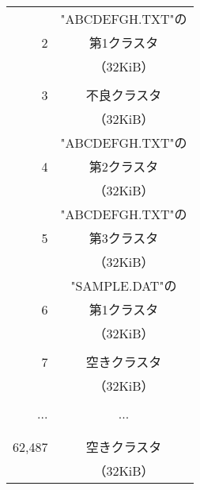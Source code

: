 \documentclass[border=1mm]{standalone}
\begin{document}
\tt\small\begin{tabular}{r | c |}\cline{2-2}
  & "ABCDEFGH.TXT"の \\
2 & 第1クラスタ  \\
  & （32KiB）    \\\cline{2-2}
  &              \\
3 & 不良クラスタ \\
  & （32KiB）   \\\cline{2-2}
  & "ABCDEFGH.TXT"の \\
4 & 第2クラスタ \\
  & （32KiB）   \\\cline{2-2}
  & "ABCDEFGH.TXT"の \\
5 & 第3クラスタ \\
  & （32KiB）   \\\cline{2-2}
  & "SAMPLE.DAT"の \\
6 & 第1クラスタ \\
  & （32KiB）   \\\cline{2-2}
  &             \\
7 & 空きクラスタ \\
  & （32KiB）   \\\cline{2-2}
  &             \\
... & ...       \\
  &             \\\cline{2-2}
  &             \\
62,487 & 空きクラスタ \\
  & （32KiB）   \\\cline{2-2}
\end{tabular}
\end{document}
